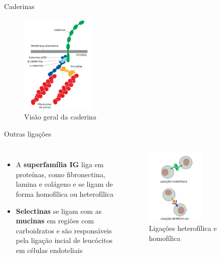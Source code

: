 \documentclass[aspectratio=169]{beamer}
\begin{document}
\begin{frame}{Caderinas}
    \begin{figure}
        \includegraphics[width=0.32\textwidth]{img/bio/close_caderina.jpg}
        \caption{Visão geral da caderina}
    \end{figure}
\end{frame}

\begin{frame}{Outras ligações}
    \begin{columns}[t, onlytextwidth]
            \begin{itemize}
                \item A \textbf{superfamília IG} liga em proteínas, como fibronectina, lamina e 
                colágeno e se ligam de forma homofílica ou heterofílica
                \item \textbf{Selectinas} se ligam com as \textbf{mucinas} em regiões com carboidratos
                e são responsáveis pela ligação incial de leucócitos em células endoteliais 
            \end{itemize}    

            \begin{figure}\label{fig:hetero_homo}
                \includegraphics[width=0.6\textwidth]{img/bio/hetero_homo_bonds.jpg}
                \caption{Ligações heterofílica e homofílica}
            \end{figure}
    \end{columns}
\end{frame}
\end{document}
